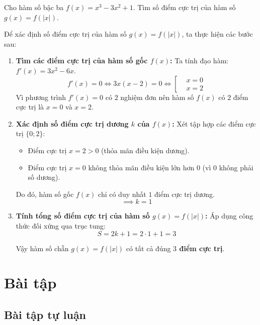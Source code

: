 \documentclass[12pt]{article}
\begin{document}
	\begin{vidu}[3]
		Cho hàm số bậc ba $f(x) = x^3 - 3x^2 + 1$. Tìm số điểm cực trị của hàm số $g(x) = f(|x|)$.
	\end{vidu}
	
	\begin{loigiai}
		Để xác định số điểm cực trị của hàm số $g(x) = f(|x|)$, ta thực hiện các bước sau:
		
		\begin{enumerate}[label=\textbf{Bước \arabic*:}, leftmargin=*]
			\item \textbf{Tìm các điểm cực trị của hàm số gốc $f(x)$:}
			Ta tính đạo hàm: $f'(x) = 3x^2 - 6x$.
			$$f'(x) = 0 \iff 3x(x - 2) = 0 \iff \left[\begin{aligned} &x = 0 \\ &x = 2 \end{aligned}\right.$$
			Vì phương trình $f'(x) = 0$ có $2$ nghiệm đơn nên hàm số $f(x)$ có $2$ điểm cực trị là $x = 0$ và $x = 2$.
			
			\item \textbf{Xác định số điểm cực trị dương $k$ của $f(x)$:}
			Xét tập hợp các điểm cực trị $\{0; 2\}$:
			\begin{itemize}
				\item Điểm cực trị $x = 2 > 0$ (thỏa mãn điều kiện dương).
				\item Điểm cực trị $x = 0$ không thỏa mãn điều kiện lớn hơn $0$ (vì $0$ không phải số dương).
			\end{itemize}
			Do đó, hàm số gốc $f(x)$ chỉ có duy nhất $1$ điểm cực trị dương.
			$$\implies k = 1$$
			
			\item \textbf{Tính tổng số điểm cực trị của hàm số $g(x) = f(|x|)$:}
			Áp dụng công thức đối xứng qua trục tung:
			$$S = 2k + 1 = 2 \cdot 1 + 1 = 3$$
			
			Vậy hàm số chẵn $g(x) = f(|x|)$ có tất cả đúng \textbf{$3$ điểm cực trị}.
		\end{enumerate}
	\end{loigiai}
	\newpage
	
	\section{Bài tập}
	
	\subsection{Bài tập tự luận}
	
\end{document}
